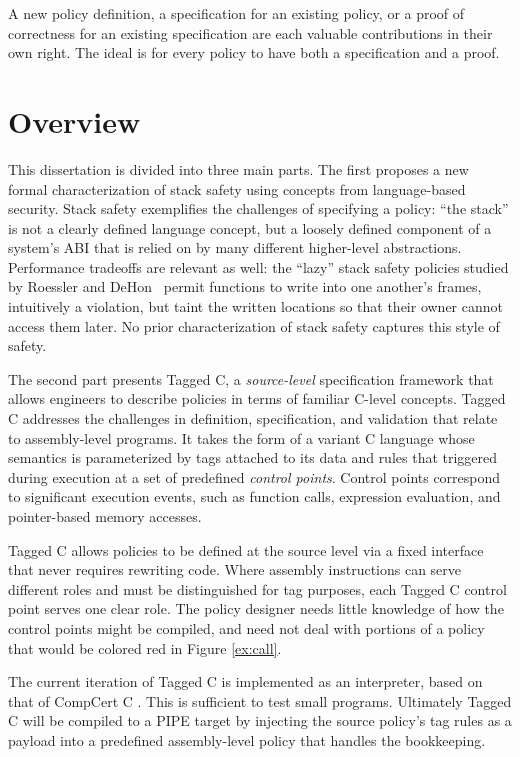 \documentclass{report}
\begin{document}
A new policy definition, a specification for an existing policy, or a proof of correctness for
an existing specification are each valuable contributions in their own right. The ideal is for
every policy to have both a specification and a proof. 

\section{Overview}

This dissertation is divided into three main parts. The first proposes a new formal characterization
of stack safety using concepts from language-based security. Stack safety exemplifies the challenges
of specifying a policy: ``the stack'' is not a clearly defined language concept, but a loosely
defined component of a system's ABI that is relied on by many different higher-level abstractions.
Performance tradeoffs are relevant as well: the ``lazy'' stack safety policies studied by
Roessler and DeHon~\cite{RoesslerD18} permit functions to write into one another's
frames, intuitively a violation, but taint the written locations so that their owner cannot
access them later. No prior characterization of stack safety captures this style of safety.

The second part presents Tagged C, a \emph{source-level} specification framework that allows
engineers to describe policies in terms of familiar C-level concepts. Tagged C addresses the
challenges in definition, specification, and validation that relate to assembly-level programs.
It takes the form of a variant C language whose semantics is parameterized by tags
attached to its data and rules that triggered during execution at a set of predefined
\emph{control points}. Control points correspond to significant execution events, such as
function calls, expression evaluation, and pointer-based memory accesses.

Tagged C allows policies to be defined at the source level via a fixed interface
that never requires rewriting code. Where assembly instructions can serve different roles and must
be distinguished for tag purposes, each Tagged C control point serves one clear role. The policy
designer needs little knowledge of how the control points might be compiled, and need not
deal with portions of a policy that would be colored red in Figure \ref{ex:call}.

The current iteration of Tagged C is implemented as an interpreter, based on that of
CompCert C \cite{Leroy09:CompCert}. This is sufficient to test small programs. Ultimately
Tagged C will be compiled to a PIPE target by injecting the source policy's tag rules
as a payload into a predefined assembly-level policy that handles the bookkeeping.
\end{document}
